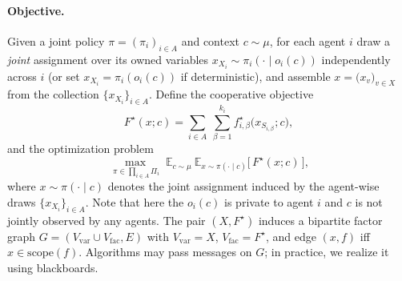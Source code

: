 \paragraph{Objective.}
Given a  joint policy $\pi=(\pi_i)_{i\in A}$ and context $c\sim\mu$, for each agent $i$ draw a \emph{joint} assignment over its owned variables
$x_{X_i}\sim \pi_i(\cdot\mid o_i(c))$ independently across $i$
(or set $x_{X_i}=\pi_i(o_i(c))$ if deterministic), and assemble
$x=\big(x_v\big)_{v\in X}$ from the collection $\{x_{X_i}\}_{i\in A}$.
Define the cooperative objective
\[
F^\star(x;c)=\sum_{i\in A}\ \sum_{\beta=1}^{k_i} f_{i,\beta}^\star\big(x_{S_{i,\beta}};c\big),
\]
and the optimization problem
\[
\max_{\ \pi\in\prod_{i\in A}\Pi_i}\;
\mathbb{E}_{c\sim\mu}\ \mathbb{E}_{x\sim \pi(\cdot\mid c)}\big[\,F^\star(x;c)\,\big],
\]
where $x\sim \pi(\cdot\mid c)$ denotes the joint assignment induced by the
agent-wise draws $\{x_{X_i}\}_{i\in A}$. Note that here the $o_i(c)$ is private to agent $i$ and $c$ is not jointly observed by any agents. The pair $(X,F^\star)$ induces a bipartite factor graph $G=(V_\text{var}\cup V_\text{fac},E)$ with $V_\text{var}=X$, $V_\text{fac}=F^\star$, and edge $(x,f)$ iff $x\in \mathrm{scope}(f)$. Algorithms may pass messages on $G$; in practice, we realize it using blackboards.









